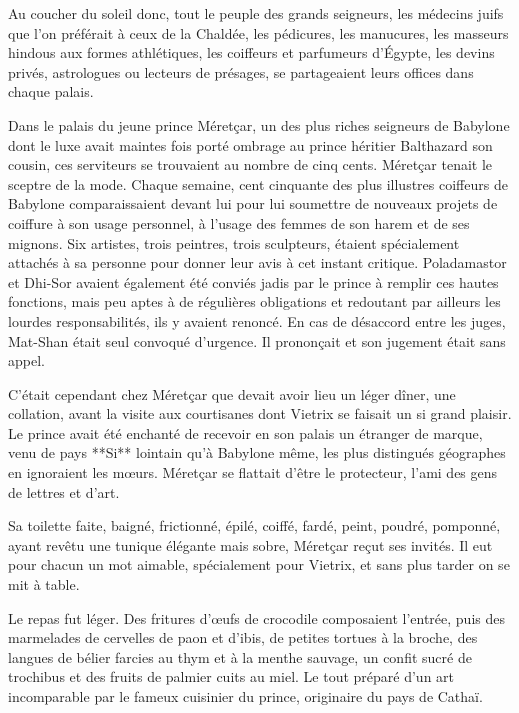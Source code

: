 \documentclass[a4paper, 11pt, oneside, polutonikogreek, french]{article}
\begin{document}
Au coucher du soleil donc, tout le peuple des grands seigneurs, les médecins juifs que l'on préférait à ceux de la Chaldée, les pédicures, les manucures, les masseurs hindous aux formes athlétiques, les coiffeurs et parfumeurs d'Égypte, les devins privés, astrologues ou lecteurs de présages, se partageaient leurs offices dans chaque palais.

\bigskip
\centerline{\EightStarTaper}
\centerline{\EightStarTaper\EightStarTaper}
\bigskip

Dans le palais du jeune prince Méretçar, un des plus riches seigneurs de Babylone dont le luxe avait maintes fois porté ombrage au prince héritier Balthazard son cousin, ces serviteurs se trouvaient au nombre de cinq cents. Méretçar tenait le sceptre de la mode. Chaque semaine, cent cinquante des plus illustres coiffeurs de Babylone comparaissaient devant lui pour lui soumettre de nouveaux projets de coiffure à son usage personnel, à l'usage des femmes de son harem et de ses mignons. Six artistes, trois peintres, trois sculpteurs, étaient spécialement attachés à sa personne pour donner leur avis à cet instant critique. Poladamastor et Dhi-Sor avaient également été conviés jadis par le prince à remplir ces hautes fonctions, mais peu aptes à de régulières obligations et redoutant par ailleurs les lourdes responsabilités, ils y avaient renoncé. En cas de désaccord entre les juges, Mat-Shan était seul convoqué d'urgence. Il prononçait et son jugement était sans appel.

C'était cependant chez Méretçar que devait avoir lieu un léger dîner, une collation, avant la visite aux courtisanes dont Vietrix se faisait un si grand plaisir. Le prince avait été enchanté de recevoir en son palais un étranger de marque, venu de pays **Si** lointain qu'à Babylone même, les plus distingués géographes en ignoraient les mœurs. Méretçar se flattait d'être le protecteur, l'ami des gens de lettres et d'art.

\bigskip
\centerline{\EightStarTaper}
\centerline{\EightStarTaper\EightStarTaper}
\bigskip

Sa toilette faite, baigné, frictionné, épilé, coiffé, fardé, peint, poudré, pomponné, ayant revêtu une tunique élégante mais sobre, Méretçar reçut ses invités. Il eut pour chacun un mot aimable, spécialement pour Vietrix, et sans plus tarder on se mit à table.

Le repas fut léger. Des fritures d'œufs de crocodile composaient l'entrée, puis des marmelades de cervelles de paon et d'ibis, de petites tortues à la broche, des langues de bélier farcies au thym et à la menthe sauvage, un confit sucré de trochibus et des fruits de palmier cuits au miel. Le tout préparé d'un art incomparable par le fameux cuisinier du prince, originaire du pays de Cathaï.
\end{document}
